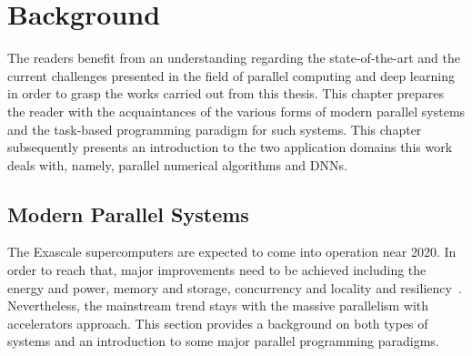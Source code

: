 \chapter{Background}
\label{chap:background}

The readers benefit from an understanding regarding the state-of-the-art and 
the current challenges presented in the field of parallel computing and deep 
learning in order to grasp the works carried out from this thesis.
This chapter prepares the reader with the acquaintances of the various forms of 
modern parallel systems and the task-based programming paradigm for such systems. 
This chapter subsequently presents an introduction to the two application domains
this work deals with, namely, parallel numerical algorithms and DNNs.

\section{Modern Parallel Systems}
The Exascale supercomputers are expected to come into operation near 
2020. In order to reach that, major improvements need to be achieved including 
the energy and power, memory and storage, concurrency and locality and 
resiliency~\cite{doe}. Nevertheless, the mainstream trend stays with the massive 
parallelism with accelerators approach. This section provides a background on 
both types of systems and an introduction to some major parallel programming 
paradigms.

